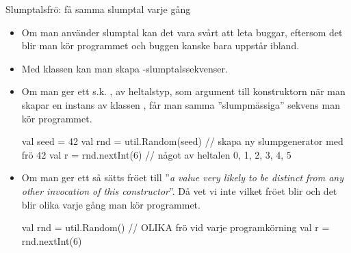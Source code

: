 \begin{Slide}{Slumptalsfrö: få samma slumptal varje gång}\SlideFontTiny
\begin{itemize}
\item Om man använder slumptal kan det vara svårt att leta buggar, eftersom det blir  man kör programmet och buggen kanske bara uppstår ibland.

\item Med klassen  kan man skapa -slumptalssekvenser.
\pause
\item Om man ger ett s.k.  , av heltalstyp, som argument till konstruktorn när man skapar en instans av klassen , får man samma ''slumpmässiga'' sekvens  man kör programmet.

\begin{Code}
  val seed = 42
  val rnd = util.Random(seed) // skapa ny slumpgenerator med frö 42
  val r = rnd.nextInt(6)      // något av heltalen 0, 1, 2, 3, 4, 5
\end{Code}
\pause
\item Om man  ger ett  så sätts fröet till ''\emph{a value very likely to be distinct from any other invocation of this constructor}''. Då vet vi inte vilket fröet blir och det blir olika varje gång man kör programmet.
\begin{Code}
  val rnd = util.Random() // OLIKA frö vid varje programkörning
  val r = rnd.nextInt(6) 
\end{Code}
\end{itemize}
\end{Slide}

%
%
%
%

